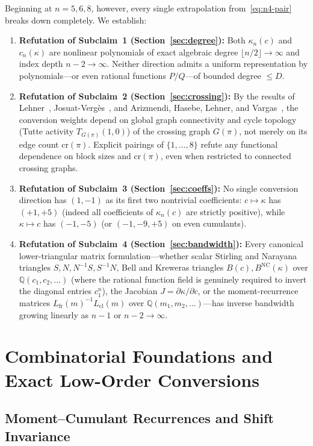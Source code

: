 \documentclass[11pt,a4paper]{article}
\theoremstyle{definition}
\theoremstyle{remark}
\newcommand{\NC}{\mathrm{NC}}
\newcommand{\crpair}{\mathrm{cr}}
\newcommand{\cl}{\mathrm{cl}}
\newcommand{\fr}{\mathrm{fr}}
\newcommand{\Q}{\mathbb{Q}}
\begin{document}
Beginning at $n = 5, 6, 8$, however, every single extrapolation from~\eqref{eq:n4-pair} breaks down completely. We establish:
\begin{enumerate}
  \item \textbf{Refutation of Subclaim~1 (Section~\ref{sec:degree}):} Both $\kappa_n(c)$ and $c_n(\kappa)$ are nonlinear polynomials of exact algebraic degree $\lfloor n/2 \rfloor \to \infty$ and index depth $n - 2 \to \infty$. Neither direction admits a uniform representation by polynomials---or even rational functions $P/Q$---of bounded degree $\le D$.
  \item \textbf{Refutation of Subclaim~2 (Section~\ref{sec:crossing}):} By the results of Lehner~\cite{Lehner2002}, Josuat-Verg\`es~\cite{JosuatVerges2013}, and Arizmendi, Hasebe, Lehner, and Vargas~\cite{AHLV2015}, the conversion weights depend on global graph connectivity and cycle topology (Tutte activity $T_{G(\pi)}(1,0)$) of the crossing graph $G(\pi)$, not merely on its edge count $\crpair(\pi)$. Explicit pairings of $\{1,\dots,8\}$ refute any functional dependence on block sizes and $\crpair(\pi)$, even when restricted to connected crossing graphs.
  \item \textbf{Refutation of Subclaim~3 (Section~\ref{sec:coeffs}):} No single conversion direction has $(1,-1)$ as its first two nontrivial coefficients: $c \mapsto \kappa$ has $(+1,+5)$ (indeed all coefficients of $\kappa_n(c)$ are strictly positive), while $\kappa \mapsto c$ has $(-1,-5)$ (or $(-1,-9,+5)$ on even cumulants).
  \item \textbf{Refutation of Subclaim~4 (Section~\ref{sec:bandwidth}):} Every canonical lower-triangular matrix formulation---whether scalar Stirling and Narayana triangles $S, N, N^{-1}S, S^{-1}N$, Bell and Kreweras triangles $B(c), B^{\NC}(\kappa)$ over $\Q(c_1,c_2,\dots)$ (where the rational function field is genuinely required to invert the diagonal entries $c_1^n$), the Jacobian $J = \partial\kappa/\partial c$, or the moment-recurrence matrices $L_{\fr}(m)^{-1}L_{\cl}(m)$ over $\Q(m_1,m_2,\dots)$---has inverse bandwidth growing linearly as $n - 1$ or $n - 2 \to \infty$.
\end{enumerate}

\section{Combinatorial Foundations and Exact Low-Order Conversions}\label{sec:prelim}

\subsection{Moment--Cumulant Recurrences and Shift Invariance}
\end{document}
